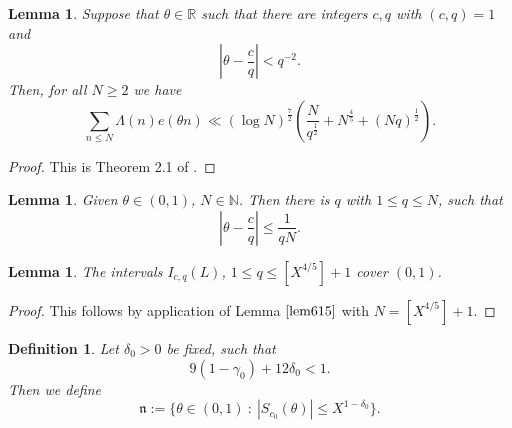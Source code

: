 \documentclass{amsart}
\newtheorem{lemma}[theorem]{Lemma}
\numberwithin{equation}{subsection}
\newtheorem{definition}[theorem]{Definition}
\begin{document}
\begin{lemma}\label{lem63}
Suppose that $\theta\in\mathbb{R}$ such that there are integers $c,q$ with $(c,q)=1$ and 
$$\left|\theta-\frac{c}{q}\right|< q^{-2}.$$
Then, for all $N\geq 2$ we have
$$\sum_{n\leq N} \Lambda(n)e(\theta n)\ll (\log N)^{\frac{7}{2}}\left(\frac{N}{q^{\frac{1}{2}}}+N^{\frac{4}{5}}+(Nq)^{\frac{1}{2}}\right).$$
\end{lemma}

\begin{proof}
This is Theorem 2.1 of  \cite{maynard}.
\end{proof}
 
 
 \begin{lemma}\label{lem615}
Given $\theta\in (0,1)$, $N\in\mathbb{N}$. Then there is $q$ with $1\leq q\leq N$, such that 
\[
\left|\theta-\frac{c}{q}\right|\leq \frac{1}{qN}.  \tag{6.15}
\]
\end{lemma}



\begin{lemma}\label{lem617}
The intervals $I_{c,q}(L)$, $1\leq q\leq [X^{4/5}]+1$ cover $(0,1)$.
\end{lemma}
\begin{proof}
This follows by application of Lemma $\ref{lem615}$ with $N=[X^{4/5}]+1$.
\end{proof}

\begin{definition}\label{def618}
Let $\delta_0>0$ be fixed, such that 
$$9(1-\gamma_0)+12\delta_0<1.$$
Then we define
$$\mathfrak{n}:=\{ \theta\in(0,1)\::\: \left|S_{c_0}(\theta)\right|\leq X^{1-\delta_0}\}.$$
\end{definition}

\end{document}
